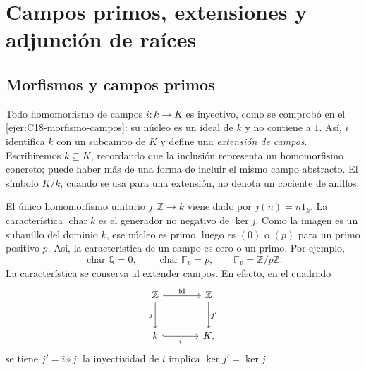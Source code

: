 \section{Campos primos, extensiones y adjunción de raíces}\label{sec:campos-extensiones}

\subsection{Morfismos y campos primos}\label{tema:22-1-1}
Todo homomorfismo de campos $i:k\to K$ es inyectivo, como se comprobó en el \cref{ejer:C18-morfismo-campos}: su núcleo es un ideal de $k$ y no contiene a $1$. Así, $i$ identifica $k$ con un subcampo de $K$ y define una \emph{extensión de campos}. Escribiremos $k\subseteq K$, recordando que la inclusión representa un homomorfismo concreto; puede haber más de una forma de incluir el mismo campo abstracto. El símbolo $K/k$, cuando se usa para una extensión, no denota un cociente de anillos.

El único homomorfismo unitario $j:\mathbb Z\to k$ viene dado por $j(n)=n1_k$. La característica $\operatorname{char}k$ es el generador no negativo de $\ker j$. Como la imagen es un subanillo del dominio $k$, ese núcleo es primo, luego es $(0)$ o $(p)$ para un primo positivo $p$. Así, la característica de un campo es cero o un primo. Por ejemplo,
\[
\operatorname{char}\mathbb Q=0,\qquad
\operatorname{char}\mathbb F_p=p,\qquad
\mathbb F_p=\mathbb Z/p\mathbb Z.
\]
La característica se conserva al extender campos. En efecto, en el cuadrado
\[
\begin{tikzcd}[column sep=large,row sep=large]
\mathbb Z\arrow[r,"\id"]\arrow[d,"j"']&\mathbb Z\arrow[d,"j'"]\\
k\arrow[r,hook,"i"']&K,
\end{tikzcd}
\]
se tiene $j'=i\circ j$; la inyectividad de $i$ implica $\ker j'=\ker j$.

